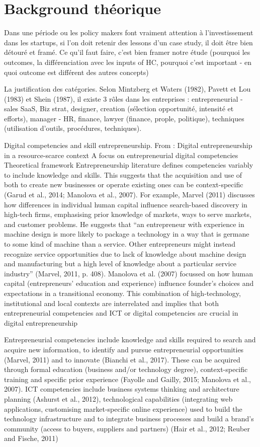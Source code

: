 \documentclass[12pt]{article}
\begin{document}
\section{Background théorique}

Dans une période ou les policy makers font vraiment attention à l'investissement dans les startups, si l'on doit retenir des lessons d'un case study, il doit être bien détouré et framé. Ce qu'il faut faire, c'est bien framer notre étude (pourquoi les outcomes, la différenciation avec les inputs of HC, pourquoi c'est important - en quoi outcome est différent des autres concepts)

La justification des catégories.
Selon Mintzberg et Waters (1982), Pavett et Lou (1983) et Shein (1987), il existe 3 rôles dans les entreprises : entrepreneurial - sales SaaS, Biz strat, designer, creation (sélection opportunité, intensité et efforts), manager - HR, finance, lawyer (finance, prople, politique), techniques (utilisation d'outils, procédures, techniques).

Digital competencies and skill entrepreneurship.
From : Digital entrepreneurship in a resource-scarce context A focus on entrepreneurial digital competencies
Theoretical framework Entrepreneurship literature defines competencies variably to include knowledge and skills. This suggests that the acquisition and use of both to create new businesses or operate existing ones can be context-specific (Garud et al., 2014; Manolova et al., 2007). For example, Marvel (2011) discusses how differences in individual human capital influence search-based discovery in high-tech firms, emphasising prior knowledge of markets, ways to serve markets, and customer problems. He suggests that “an entrepreneur with experience in machine design is more likely to package a technology in a way that is germane to some kind of machine than a service. Other entrepreneurs might instead recognize service opportunities due to lack of knowledge about machine design and manufacturing but a high level of knowledge about a particular service industry” (Marvel, 2011, p. 408). Manolova et al. (2007) focussed on how human capital (entrepreneurs’ education and experience) influence founder’s choices and expectations in a transitional economy. This combination of high-technology, institutional and local contexts are interrelated and implies that both entrepreneurial competencies and ICT or digital competencies are crucial in digital entrepreneurship

Entrepreneurial competencies include knowledge and skills required to search and acquire new information, to identify and pursue entrepreneurial opportunities (Marvel, 2011) and to innovate (Bianchi et al., 2017). These can be acquired through formal education (business and/or technology degree), context-specific training and specific prior experience (Fayolle and Gailly, 2015; Manolova et al., 2007). ICT competencies include business systems thinking and architecture planning (Ashurst et al., 2012), technological capabilities (integrating web applications, customising market-specific online experience) used to build the technology infrastructure and to integrate business processes and build a brand’s community (access to buyers, suppliers and partners) (Hair et al., 2012; Reuber and Fische, 2011)
\end{document}
